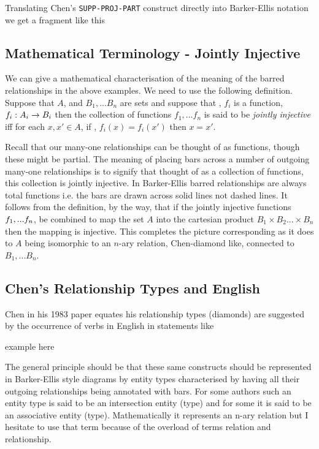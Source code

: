 \mynote 
Translating Chen's \verb'SUPP-PROJ-PART' construct directly into Barker-Ellis notation we get a fragment like this
\begin{center}
\scalebox{0.95}{}
\end{center}


\subsection{Mathematical Terminology - Jointly Injective}
\label{JointlyInjective}
\mynote
We can give a mathematical characterisation of the meaning of the barred relationships in the above examples.
We need to use the following definition.
Suppose that $A$, and $B_1,...B_n$ are sets and suppose that \foreachi, $f_i$ is a function, $f_i:A_i \rightarrow B_i$ 
then the collection of functions $f_1,...f_n$ is said to be \textit{jointly injective}
iff for each $x,x' \in A$, if \foreachi, $f_i(x)=f_i(x')$ then $x=x'$.

Recall that our many-one relationships can be thought of as functions, though these might be partial.
The meaning of placing bars across a number of outgoing many-one relationships is to signify that thought of as a collection of functions, this collection is jointly injective. In Barker-Ellis barred relationships are always total functions i.e. the bars are drawn across solid lines not dashed lines.
\mynote
It follows from the definition, by the way, that if the jointly injective functions $f_1,...f_n$, be combined
to map the set $A$ into the cartesian product $B_1 \times B_2 ... \times B_n$
then the mapping is injective. This completes the picture corresponding as it does to $A$ being isomorphic to an $n$-ary relation,
Chen-diamond like, connected to $B_1,...B_n$.

\subsection{Chen's Relationship Types and English}
\mynote
Chen in his 1983 paper equates his relationship types (diamonds) are suggested by
the occurrence of verbs in English in statements like
\begin{center}
example here
\end{center}

The general principle should be that these same constructs should be 
represented in Barker-Ellis style diagrams by entity types characterised by having
all their outgoing relationships being  annotated with bars.
For some authors such an entity type is said to be an intersection entity (type)
and for some it is said to be an associative entity (type). Mathematically it represents an n-ary relation but I hesitate to use that term because of the overload of terms relation and relationship. 

